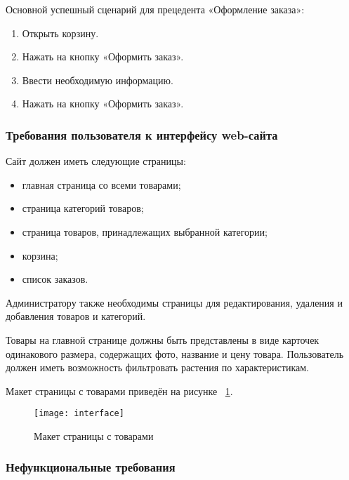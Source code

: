 Основной успешный сценарий для прецедента «Оформление заказа»:
\begin{enumerate}
	\item Открыть корзину.
	\item Нажать на кнопку «Оформить заказ».
	\item Ввести необходимую информацию.
	\item Нажать на кнопку «Оформить заказ».
\end{enumerate}

\subsubsection{Требования пользователя к интерфейсу web-сайта}

Сайт должен иметь следующие страницы:
\begin{itemize}
	\item главная страница со всеми товарами;
	\item страница категорий товаров;
	\item страница товаров, принадлежащих выбранной категории;
	\item корзина;
	\item список заказов.
\end{itemize}

Администратору также необходимы страницы для редактирования, удаления и добавления товаров и категорий.

Товары на главной странице должны быть представлены в виде карточек одинакового размера, содержащих фото, название и цену товара. Пользователь должен иметь возможность фильтровать растения по характеристикам.

Макет страницы с товарами приведён на рисунке ~\ref{interface:image}.

\begin{figure}[ht]
	\texttt{[image: interface]}
	\caption{Макет страницы с товарами}
	\label{interface:image}
\end{figure}

\subsubsection{Нефункциональные требования}

